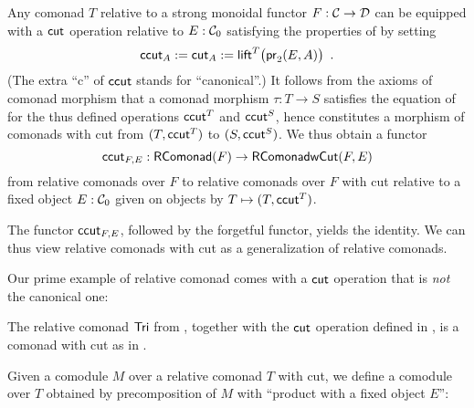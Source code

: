 \documentclass[envcountsame]{llncs}
\begin{document}
\begin{Long}
\begin{remark}\label{canonical_cut}
 Any comonad $T$ relative to a strong monoidal functor $F:{\mathcal{C}}\to\mathcal{D}$  can be equipped with a $\mathsf{cut}$ operation relative to 
 $E:{\mathcal{C}}_0$ satisfying the properties of  by setting
   \[ \mathsf{ccut}_A := \mathsf{cut}_A := \mathsf{lift}^T\bigl(\mathsf{pr}_2(E,A)\bigr) \enspace . \]
 (The extra \enquote{c} of $\mathsf{ccut}$ stands for \enquote{canonical}.)
 It follows from the axioms of comonad morphism that a comonad morphism $\tau : T\to S$ satisfies the equation of  
 for the thus defined operations $\mathsf{ccut}^T$ and $\mathsf{ccut}^S$, hence constitutes a morphism of comonads with cut from $(T,\mathsf{ccut}^T)$ to $(S,\mathsf{ccut}^S)$.
 We thus obtain a functor 
 \[ \mathsf{ccut}_{F,E} : \mathsf{RComonad}(F) \to \mathsf{\mathsf{RComonad} wCut}(F,E)\]
 from relative comonads over $F$ to relative comonads over $F$ with cut relative to a fixed object $E:{\mathcal{C}}_0$ given on 
 objects by $T\mapsto (T,\mathsf{ccut}^T)$.
\end{remark}

The functor $\mathsf{ccut}_{F,E}$, followed by the forgetful functor, yields the identity. We can thus view
relative comonads with cut as a generalization of relative comonads.
\end{Long}

\begin{Long}
Our prime example of relative comonad comes with a $\mathsf{cut}$ operation that is \emph{not} the canonical one:
\end{Long}

\begin{example}%
\label{def:cut_for_tri}
  The relative comonad $\mathsf{Tri}$ from , together with the $\mathsf{cut}$ operation defined in , 
  is a comonad with cut as in .
\end{example}





Given a comodule $M$ over a relative comonad $T$ with cut, we define a comodule over $T$ obtained by precomposition of $M$ with
\enquote{product with a fixed object $E$}:
\end{document}
